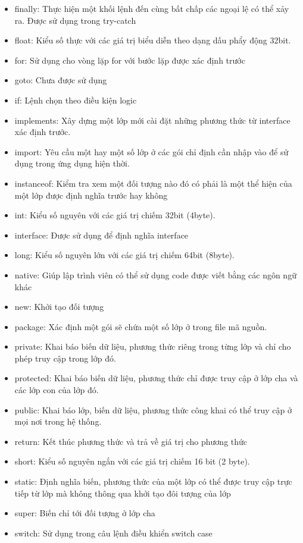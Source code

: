 \begin{itemize}
\item
finally: Thực hiện một khối lệnh đến cùng bất chấp các ngoại lệ có thể xảy ra. Được sử dụng trong try-catch 
\item
float: Kiểu số thực với các giá trị biểu diễn theo dạng dấu phẩy động 32bit. 
\item
for: Sử dụng cho vòng lặp for với bước lặp được xác định trước 
\item
goto: Chưa được sử dụng 
\item
if: Lệnh chọn theo điều kiện logic 
\item
implements: Xây dựng một lớp mới cài đặt những phương thức từ interface xác định trước. 
\item
import: Yêu cầu một hay một số lớp ở các gói chỉ định cần nhập vào để sử dụng trong ứng dụng hiện thời. 
\item
instanceof: Kiểm tra xem một đối tượng nào đó có phải là một thể hiện của một lớp được định nghĩa trước hay không 
\item
int: Kiểu số nguyên với các giá trị chiếm 32bit (4byte). 
\item
interface: Được sử dụng để định nghĩa interface 
\item
long: Kiểu số nguyên lớn với các giá trị chiếm 64bit (8byte). 
\item
native: Giúp lập trình viên có thể sử dụng code được viết bằng các ngôn ngữ khác 
\item
new: Khởi tạo đối tượng 
\item
package: Xác định một gói sẽ chứa một số lớp ở trong file mã nguồn. 
\item
private: Khai báo biến dữ liệu, phương thức riêng trong từng lớp và chỉ cho phép truy cập trong lớp đó. 
\item
protected: Khai báo biến dữ liệu, phương thức chỉ được truy cập ở lớp cha và các lớp con của lớp đó. 
\item
public: Khai báo lớp, biến dữ liệu, phương thức công khai có thể truy cập ở mọi nơi trong hệ thống. 
\item
return: Kết thúc phương thức và trả về giá trị cho phương thức 
\item
short: Kiểu số nguyên ngắn với các giá trị chiếm 16 bit (2 byte). 
\item
static: Định nghĩa biến, phương thức của một lớp có thể được truy cập trực tiếp từ lớp mà không thông qua khởi tạo đôi tượng của lớp 
\item
super: Biến chỉ tới đối tượng ở lớp cha 
\item
switch: Sử dụng trong câu lệnh điều khiển switch case 

\end{itemize}
